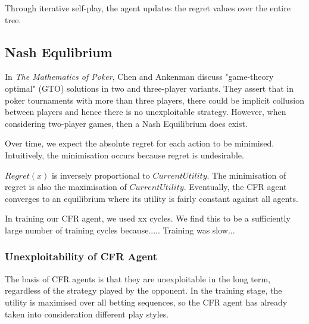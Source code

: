 \documentclass{article}
\begin{document}
Through iterative self-play, the agent updates the regret values over the entire tree.

\subsection{Nash Equlibrium}

In \textit{The Mathematics of Poker}, Chen and Ankenman discuss "game-theory optimal" (GTO) solutions in two and three-player variants. They assert that in poker tournaments with more than three players, there could be implicit collusion between players and hence there is no unexploitable strategy. However, when considering two-player games, then a Nash Equilibrium does exist. 

Over time, we expect the absolute regret for each action to be minimised. Intuitively, the minimisation occurs because regret is undesirable. 



$Regret(x)$ is inversely proportional to $CurrentUtility$. The minimisation of regret is also the maximisation of $CurrentUtility$. Eventually, the CFR agent converges to an equilibrium where its utility is fairly constant against all agents.

In training our CFR agent, we used xx cycles. We find this to be a sufficiently large number of training cycles because..... Training was slow...

\subsubsection{Unexploitability of CFR Agent}

The basis of CFR agents is that they are unexploitable in the long term, regardless of the strategy played by the opponent. In the training stage, the utility is maximised over all betting sequences, so the CFR agent has already taken into consideration different play styles.
\end{document}
